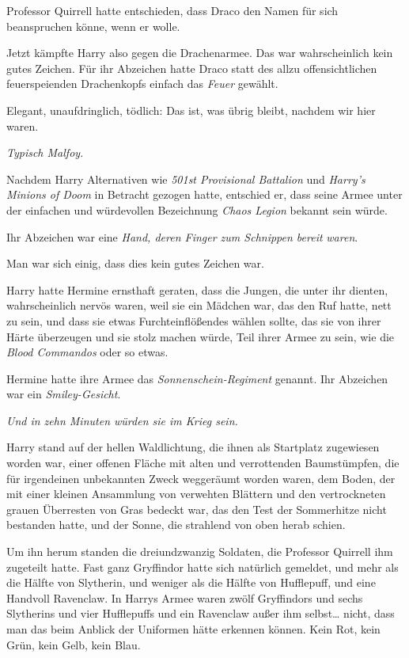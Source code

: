 {Professor Quirrell hatte entschieden, dass Draco den Namen für sich beanspruchen könne, wenn er wolle.

Jetzt kämpfte Harry also gegen die Drachenarmee. Das war wahrscheinlich kein gutes Zeichen. Für ihr Abzeichen hatte Draco statt des allzu offensichtlichen feuerspeienden Drachenkopfs einfach das \emph{Feuer} gewählt.

Elegant, unaufdringlich, tödlich: Das ist, was übrig bleibt, nachdem wir hier waren.

\emph{Typisch Malfoy.}

Nachdem Harry Alternativen wie \emph{501st Provisional Battalion} und \emph{Harry's Minions of Doom} in Betracht gezogen hatte, entschied er, dass seine Armee unter der einfachen und würdevollen Bezeichnung \emph{Chaos Legion} bekannt sein würde.

Ihr Abzeichen war eine \emph{Hand, deren Finger zum Schnippen bereit} \emph{waren}.

Man war sich einig, dass dies kein gutes Zeichen war.

Harry hatte Hermine ernsthaft geraten, dass die Jungen, die unter ihr dienten, wahrscheinlich nervös waren, weil sie ein Mädchen war, das den Ruf hatte, nett zu sein, und dass sie etwas Furchteinflößendes wählen sollte, das sie von ihrer Härte überzeugen und sie stolz machen würde, Teil ihrer Armee zu sein, wie die \emph{Blood Commandos} oder so etwas.

Hermine hatte ihre Armee das \emph{Sonnenschein-Regiment} genannt. Ihr Abzeichen war ein \emph{Smiley-Gesicht}.

\emph{Und in zehn Minuten würden sie im Krieg sein.}

Harry stand auf der hellen Waldlichtung, die ihnen als Startplatz zugewiesen worden war, einer offenen Fläche mit alten und verrottenden Baumstümpfen, die für irgendeinen unbekannten Zweck weggeräumt worden waren, dem Boden, der mit einer kleinen Ansammlung von verwehten Blättern und den vertrockneten grauen Überresten von Gras bedeckt war, das den Test der Sommerhitze nicht bestanden hatte, und der Sonne, die strahlend von oben herab schien.

Um ihn herum standen die dreiundzwanzig Soldaten, die Professor Quirrell ihm zugeteilt hatte. Fast ganz Gryffindor hatte sich natürlich gemeldet, und mehr als die Hälfte von Slytherin, und weniger als die Hälfte von Hufflepuff, und eine Handvoll Ravenclaw. In Harrys Armee waren zwölf Gryffindors und sechs Slytherins und vier Hufflepuffs und ein Ravenclaw außer ihm selbst… nicht, dass man das beim Anblick der Uniformen hätte erkennen können. Kein Rot, kein Grün, kein Gelb, kein Blau.

}
